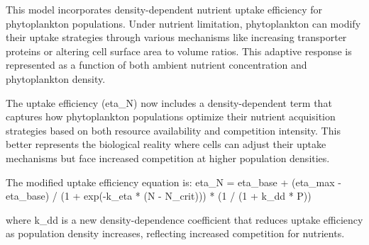 This model incorporates density-dependent nutrient uptake efficiency for phytoplankton populations. Under nutrient limitation, phytoplankton can modify their uptake strategies through various mechanisms like increasing transporter proteins or altering cell surface area to volume ratios. This adaptive response is represented as a function of both ambient nutrient concentration and phytoplankton density.

The uptake efficiency (eta_N) now includes a density-dependent term that captures how phytoplankton populations optimize their nutrient acquisition strategies based on both resource availability and competition intensity. This better represents the biological reality where cells can adjust their uptake mechanisms but face increased competition at higher population densities.

The modified uptake efficiency equation is:
eta_N = eta_base + (eta_max - eta_base) / (1 + exp(-k_eta * (N - N_crit))) * (1 / (1 + k_dd * P))

where k_dd is a new density-dependence coefficient that reduces uptake efficiency as population density increases, reflecting increased competition for nutrients.
